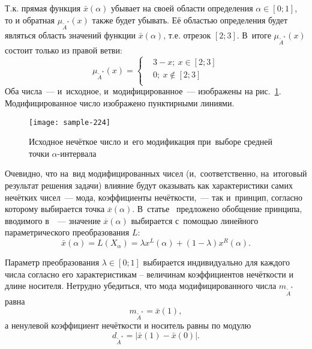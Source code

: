 Т.к. прямая функция $\bar{x}\left( \alpha  \right)$ убывает на своей области определения $\alpha \in \left[ 0;1 \right]$, то и обратная $\mu_{\tilde A^{*}}\left( x \right)$ также будет убывать. Её областью определения будет являться область значений функции $\bar{x}\left( \alpha  \right)$, т.е. отрезок $\left[ 2;3 \right]$. В~итоге $\mu_{\tilde A^{*}}\left( x \right)$ состоит только из правой ветви:
\begin{equation*}
	\mu_{\tilde A^{*}}\left( x \right)=\left\{
	\begin{aligned}
      & 3-x;\ x\in \left[ 2;3 \right] \\
      & 0;\ x\notin \left[ 2;3 \right] \\ 
    \end{aligned} \right.
\end{equation*}
Оба числа~--- и~исходное, и~модифицированное~--- изображены на рис.~\ref{fig:sample-224}. Модифицированное число изображено пунктирными линиями.
\begin{figure}[h!]
  \centering
  {
    \texttt{[image: sample-224]}
    \caption{Исходное нечёткое число и~его модификация при~выборе средней точки $\alpha$-интервала}
    \label{fig:sample-224}
  }
\end{figure}

Очевидно, что на~вид модифицированных чисел (и,~соответственно, на~итоговый результат решения задачи) влияние будут оказывать как характеристики самих нечётких чисел~--- мода, коэффициенты нечёткости,~--- так и~принцип, согласно которому выбирается точка $\overline{x}\left( \alpha  \right)$. В~статье~\cite{Vorontsov_PI} предложено обобщение принципа, вводимого в~\cite{Lebedev}~--- значение $\overline{x}\left( \alpha  \right)$ выбирается с~помощью линейного параметрического преобразования $L$:
\begin{equation}
  \label{eq:L-transform-base}
  \bar{x}\left( \alpha  \right)=L\left( X_\alpha \right)=\lambda x^L \left( \alpha  \right)+\left( 1-\lambda  \right) x^R \left( \alpha  \right).
\end{equation}

Параметр преобразования $\lambda \in \left[ 0;1 \right]$ выбирается индивидуально для каждого числа согласно его характеристикам – величинам коэффициентов нечёткости и длине носителя. Нетрудно убедиться, что мода модифицированного числа $m_{\tilde A^{*}}$ равна
\begin{equation}
\label{eq:L-mode}
  m_{\tilde A^{*}}=\bar{x}\left( 1 \right),
\end{equation}
а ненулевой коэффициент нечёткости и носитель равны по модулю
\begin{equation}
\label{eq:L-support}
  d_{\tilde A^{*}}=\left| \bar{x}\left( 1 \right)-\bar{x}\left( 0 \right) \right|.
\end{equation}

